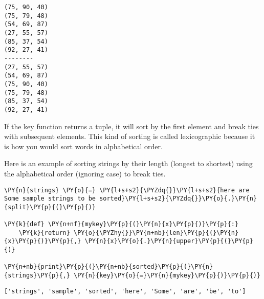 \begin{Verbatim}
(75, 90, 40)
(75, 79, 48)
(54, 69, 87)
(27, 55, 57)
(85, 37, 54)
(92, 27, 41)
--------
(27, 55, 57)
(54, 69, 87)
(75, 90, 40)
(75, 79, 48)
(85, 37, 54)
(92, 27, 41)
\end{Verbatim}


If the key function returns a tuple, it will sort by the first element and break ties with subsequent elements.  This kind of sorting is called lexicographic because it is how you would sort words in alphabetical order.


Here is an example of sorting strings by their length (longest to shortest) using the alphabetical order (ignoring case) to break ties.


\begin{Verbatim}[commandchars=\\\{\}]
\PY{n}{strings} \PY{o}{=} \PY{l+s+s2}{\PYZdq{}}\PY{l+s+s2}{here are Some sample strings to be sorted}\PY{l+s+s2}{\PYZdq{}}\PY{o}{.}\PY{n}{split}\PY{p}{(}\PY{p}{)}

\PY{k}{def} \PY{n+nf}{mykey}\PY{p}{(}\PY{n}{x}\PY{p}{)}\PY{p}{:}
    \PY{k}{return} \PY{o}{\PYZhy{}}\PY{n+nb}{len}\PY{p}{(}\PY{n}{x}\PY{p}{)}\PY{p}{,} \PY{n}{x}\PY{o}{.}\PY{n}{upper}\PY{p}{(}\PY{p}{)}

\PY{n+nb}{print}\PY{p}{(}\PY{n+nb}{sorted}\PY{p}{(}\PY{n}{strings}\PY{p}{,} \PY{n}{key}\PY{o}{=}\PY{n}{mykey}\PY{p}{)}\PY{p}{)}
\end{Verbatim}

\begin{Verbatim}
['strings', 'sample', 'sorted', 'here', 'Some', 'are', 'be', 'to']
\end{Verbatim}
